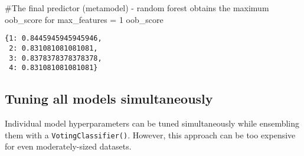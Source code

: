 \documentclass[
  letterpaper,
  DIV=11,
  numbers=noendperiod]{scrreprt}
\newenvironment{Shaded}{\begin{snugshade}}{\end{snugshade}}
\newcommand{\CommentTok}[1]{\textcolor[rgb]{0.37,0.37,0.37}{#1}}
\newcommand{\NormalTok}[1]{\textcolor[rgb]{0.00,0.23,0.31}{#1}}
\begin{document}
\begin{Shaded}
\begin{Highlighting}[]
\CommentTok{\#The final predictor (metamodel) {-} random forest obtains the maximum oob\_score for max\_features = 1}
\NormalTok{oob\_score}
\end{Highlighting}
\end{Shaded}

\begin{verbatim}
{1: 0.8445945945945946,
 2: 0.831081081081081,
 3: 0.8378378378378378,
 4: 0.831081081081081}
\end{verbatim}

\subsection{Tuning all models
simultaneously}\label{tuning-all-models-simultaneously}

Individual model hyperparameters can be tuned simultaneously while
ensembling them with a \texttt{VotingClassifier()}. However, this
approach can be too expensive for even moderately-sized datasets.
\end{document}
